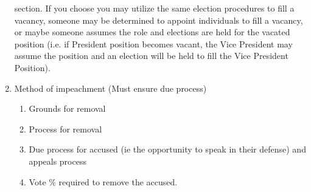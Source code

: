 \documentclass[11pt,a4paper,notitlepage]{article}
\begin{document}
\begin{enumerate}[label=\Alph*.]
  section.  If you choose you may utilize the same election procedures to fill a
  vacancy, someone may be determined to appoint individuals to fill a vacancy,
  or maybe someone assumes the role and elections are held for the vacated
  position (i.e. if President position becomes vacant, the Vice President may
  assume the position and an election will be held to fill the Vice President
  Position).
  \item Method of impeachment (Must ensure due process)
    \begin{enumerate}[label=\arabic*.]
      \item Grounds for removal
      \item Process for removal
      \item Due process for accused (ie the opportunity to speak in their
      defense) and appeals process
      \item Vote \% required to remove the accused.
    \end{enumerate}
  \end{enumerate}
\end{document}
